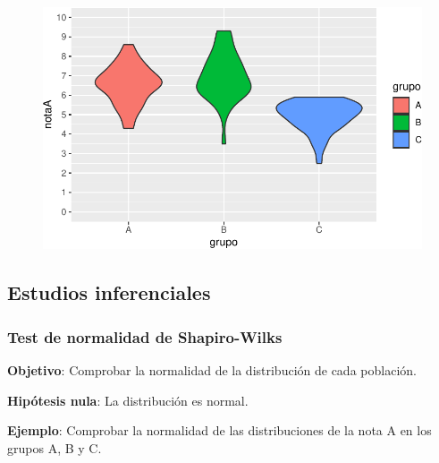\documentclass[
  a4paper,
]{scrreport}
\newenvironment{Shaded}{\begin{snugshade}}{\end{snugshade}}
\newcommand{\AttributeTok}[1]{\textcolor[rgb]{0.40,0.45,0.13}{#1}}
\newcommand{\FunctionTok}[1]{\textcolor[rgb]{0.28,0.35,0.67}{#1}}
\newcommand{\NormalTok}[1]{\textcolor[rgb]{0.00,0.23,0.31}{#1}}
\newcommand{\OtherTok}[1]{\textcolor[rgb]{0.00,0.23,0.31}{#1}}
\newcommand{\SpecialCharTok}[1]{\textcolor[rgb]{0.37,0.37,0.37}{#1}}
\newcommand{\StringTok}[1]{\textcolor[rgb]{0.13,0.47,0.30}{#1}}
\theoremstyle{definition}
\theoremstyle{definition}
\theoremstyle{remark}
\begin{document}
\begin{figure}[H]

{\centering \includegraphics{./08-analisis-estadisticos_files/figure-pdf/unnamed-chunk-48-1.pdf}

}

\end{figure}

\hypertarget{estudios-inferenciales-4}{%
\subsection{Estudios inferenciales}\label{estudios-inferenciales-4}}

\hypertarget{test-de-normalidad-de-shapiro-wilks-2}{%
\subsubsection{Test de normalidad de
Shapiro-Wilks}\label{test-de-normalidad-de-shapiro-wilks-2}}

\textbf{Objetivo}: Comprobar la normalidad de la distribución de cada
población.

\textbf{Hipótesis nula}: La distribución es normal.

\textbf{Ejemplo}: Comprobar la normalidad de las distribuciones de la
nota A en los grupos A, B y C.

\begin{Shaded}
\end{Shaded}
\end{document}

